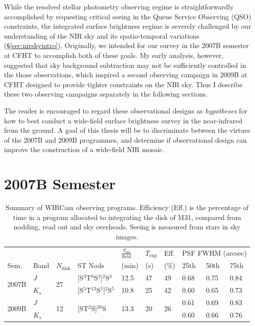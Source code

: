 \documentclass[iop]{emulateapj}
\begin{document}
While the resolved stellar photometry observing regime is straightforwardly accomplished by requesting critical seeing in the Queue Service Observing (QSO) constraints, the integrated surface brightness regime is severely challenged by our understanding of the NIR sky and its spatio-temporal variations (\S\ref{sec:nirskyintro}). Originally, we intended for our survey in the 2007B semester at CFHT to accomplish both of these goals. My early analysis, however, suggested that sky background subtraction may not be sufficiently controlled in the those observations, which inspired a second observing campaign in 2009B at CFHT designed to provide tighter constraints on the NIR sky. Thus I describe these two observing campaigns separately in the following sections.

The reader is encouraged to regard these observational designs as \emph{hypotheses} for how to best conduct a wide-field surface brightness survey in the near-infrared from the ground. A goal of this thesis will be to discriminate between the virtues of the 2007B and 2009B programmes, and determine if observational design can improve the construction of a wide-field NIR mosaic.

\section{2007B Semester}
\label{sec:obs7}

\begin{table}[t]
    \caption[Summary of WIRCam observing programs]{Summary of WIRCam observing programs. Efficiency (Eff.) is the percentage of time in a program allocated to integrating the disk of M31, compared from nodding, read out and sky overheads. Seeing is measured from stars in sky images.}
    \label{tab:obssummary}
    
    \begin{tabular}{llllllllll}
        & & & & $\frac{T_\mathrm{int}}{\mathrm{field}}$ & $T_\mathrm{exp}$ & Eff. & \multicolumn{3}{c}{PSF FWHM (arcsec)} \\ \cline{8-10}
    Sem. & Band & $N_\mathrm{disk}$ & ST Nods & (min) &  (s) &  (\%) & 25th  & 50th & 75th \\
    \hline
    \multirow{2}{*}{2007B} & $J$ & \multirow{2}{*}{27} & [S$^3$T$^8$S$^3$]$^{2}$S$^3$ & 12.5 & 47 & 49 & 0.68 & 0.75 & 0.84 \\
     & $K_s$ &  & [S$^5$T$^{13}$S$^5$]${^2}$S$^5$ & 10.8 & 25 & 42 & 0.60 &  0.65 & 0.73 \\
     \hline
     \multirow{2}{*}{2009B} & $J$ & \multirow{2}{*}{12} & \multirow{2}{*}{[ST$^2$S]$^{20}$S} & \multirow{2}{*}{13.3} & \multirow{2}{*}{20} & \multirow{2}{*}{26} & 0.61 & 0.69 & 0.83 \\
      & $K_s$ & & & & &  & 0.60 & 0.66 & 0.76 \\
      
    \end{tabular}
\end{table}
\end{document}
